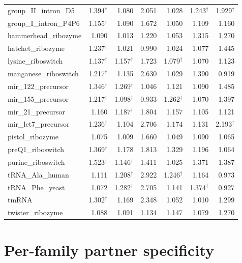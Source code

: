 \documentclass[11pt]{article}
\begin{document}
\begin{longtable}{@{}lrrrrrr@{}}
group\_II\_intron\_D5 & 1.394$^\dagger$ & 1.080 & 2.051 & 1.028 & 1.243$^\dagger$ & 1.929$^\dagger$ \\
group\_I\_intron\_P4P6 & 1.155$^\dagger$ & 1.090 & 1.672 & 1.050 & 1.109 & 1.160 \\
hammerhead\_ribozyme & 1.090 & 1.013 & 1.220 & 1.053 & 1.315 & 1.270 \\
hatchet\_ribozyme & 1.237$^\dagger$ & 1.021 & 0.990 & 1.024 & 1.077 & 1.445 \\
lysine\_riboswitch & 1.137$^\dagger$ & 1.157$^\dagger$ & 1.723 & 1.079$^\dagger$ & 1.070 & 1.123 \\
manganese\_riboswitch & 1.217$^\dagger$ & 1.135 & 2.630 & 1.029 & 1.390 & 0.919 \\
mir\_122\_precursor & 1.346$^\dagger$ & 1.269$^\dagger$ & 1.046 & 1.121 & 1.090 & 1.485 \\
mir\_155\_precursor & 1.217$^\dagger$ & 1.098$^\dagger$ & 0.933 & 1.262$^\dagger$ & 1.070 & 1.397 \\
mir\_21\_precursor & 1.160 & 1.187$^\dagger$ & 1.804 & 1.157 & 1.105 & 1.121 \\
mir\_let7\_precursor & 1.236$^\dagger$ & 1.104 & 2.706 & 1.174 & 1.131 & 2.193$^\dagger$ \\
pistol\_ribozyme & 1.075 & 1.009 & 1.660 & 1.049 & 1.090 & 1.065 \\
preQ1\_riboswitch & 1.369$^\dagger$ & 1.178 & 1.813 & 1.329 & 1.196 & 1.064 \\
purine\_riboswitch & 1.523$^\dagger$ & 1.146$^\dagger$ & 1.411 & 1.025 & 1.371 & 1.387 \\
tRNA\_Ala\_human & 1.111 & 1.208$^\dagger$ & 2.922 & 1.246$^\dagger$ & 1.164 & 0.973 \\
tRNA\_Phe\_yeast & 1.072 & 1.282$^\dagger$ & 2.705 & 1.141 & 1.374$^\dagger$ & 0.927 \\
tmRNA & 1.302$^\dagger$ & 1.169 & 2.348 & 1.052 & 1.010 & 1.299 \\
twister\_ribozyme & 1.088 & 1.091 & 1.134 & 1.147 & 1.079 & 1.270 \\
\bottomrule
\end{longtable}


\section*{Per-family partner specificity}
\end{document}
